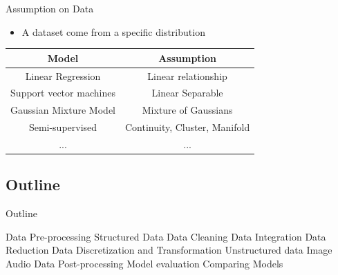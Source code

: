 \begin{frame}{Assumption on Data}
    \begin{itemize}
        \item A dataset come from a specific distribution
    \end{itemize}
    
    \begin{table}[h]
        \centering
        \begin{tabular}{c|c}
            Model & Assumption \\
            \hline
            Linear Regression & Linear relationship  \\
            Support vector machines & Linear Separable \\
            Gaussian Mixture Model & Mixture of Gaussians \\
            Semi-supervised & Continuity, Cluster, Manifold \\
            ... & ... \\
        \end{tabular}
    \end{table}
\end{frame}

\subsection{Outline}

\begin{frame}{Outline}

\begin{outline}
\1 Data Pre-processing
    \2 Structured Data
        \3 Data Cleaning
        \3 Data Integration
        \3 Data Reduction
        \3 Data Discretization and Transformation
    \2 Unstructured data
        \3 Image
        \3 Audio
\1 Data Post-processing
    \2 Model evaluation
    \2 Comparing Models
\end{outline}
    
\end{frame}